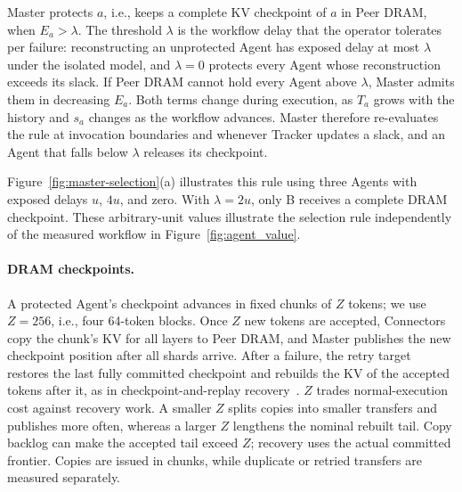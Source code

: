 Master protects $a$, i.e., keeps a complete KV checkpoint of $a$ in Peer
DRAM, when $E_a>\lambda$. The threshold $\lambda$ is the workflow delay
that the operator tolerates per failure: reconstructing an unprotected
Agent has exposed delay at most $\lambda$ under the isolated model, and $\lambda=0$ protects
every Agent whose reconstruction exceeds its slack. If Peer DRAM cannot
hold every Agent above $\lambda$, Master admits them in decreasing $E_a$.
Both terms change during execution, as $T_a$ grows with the history and
$s_a$ changes as the workflow advances. Master therefore re-evaluates the
rule at invocation boundaries and whenever Tracker updates a slack, and an
Agent that falls below $\lambda$ releases its checkpoint.

Figure~\ref{fig:master-selection}(a) illustrates this rule using three
Agents with exposed delays $u$, $4u$, and zero. With $\lambda=2u$, only B
receives a complete DRAM checkpoint. These arbitrary-unit values illustrate
the selection rule independently of the measured workflow in
Figure~\ref{fig:agent_value}.

\paragraph{DRAM checkpoints.}
\label{sec:master-checkpoint}
A protected Agent's checkpoint advances in fixed chunks of $Z$ tokens; we
use $Z=256$, i.e., four 64-token blocks. Once $Z$ new tokens are
accepted, Connectors copy the chunk's KV for all layers to Peer DRAM, and
Master publishes the new checkpoint position after all shards arrive.
After a failure, the retry target restores the last fully committed
checkpoint and rebuilds the KV of the accepted tokens after it, as in
checkpoint-and-replay recovery~\cite{strati2024dejavu,cao2026lumen}. $Z$
trades normal-execution cost against recovery work. A smaller $Z$ splits
copies into smaller transfers and publishes more often, whereas a larger
$Z$ lengthens the nominal rebuilt tail. Copy backlog can make the accepted
tail exceed $Z$; recovery uses the actual committed frontier. Copies are
issued in chunks, while duplicate or retried transfers are measured separately.

